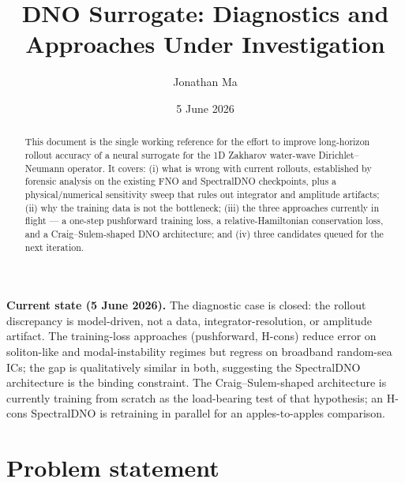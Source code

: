 \documentclass[11pt,letterpaper]{article}
\title{\textbf{DNO Surrogate: Diagnostics and Approaches Under Investigation}}
\author{Jonathan Ma}
\date{5 June 2026}
\begin{document}
\maketitle

\begin{abstract}
\noindent
This document is the single working reference for the effort to improve
long-horizon rollout accuracy of a neural surrogate for the 1D Zakharov
water-wave Dirichlet--Neumann operator. It covers: (i) what is wrong with
current rollouts, established by forensic analysis on the existing FNO and
SpectralDNO checkpoints, plus a physical/numerical sensitivity sweep that
rules out integrator and amplitude artifacts; (ii) why the training data
is not the bottleneck; (iii) the three approaches currently in flight ---
a one-step pushforward training loss, a relative-Hamiltonian conservation
loss, and a Craig--Sulem-shaped DNO architecture; and (iv) three
candidates queued for the next iteration.
\end{abstract}

\vspace{0.6em}
\noindent\textbf{Current state (5 June 2026).}
The diagnostic case is closed: the rollout discrepancy is model-driven,
not a data, integrator-resolution, or amplitude artifact. The
training-loss approaches (pushforward, H-cons) reduce error on
soliton-like and modal-instability regimes but regress on broadband
random-sea ICs; the gap is qualitatively similar in both, suggesting
the SpectralDNO architecture is the binding constraint. The
Craig--Sulem-shaped architecture is currently training from scratch
as the load-bearing test of that hypothesis; an H-cons SpectralDNO
is retraining in parallel for an apples-to-apples comparison.

\section{Problem statement}
\end{document}
